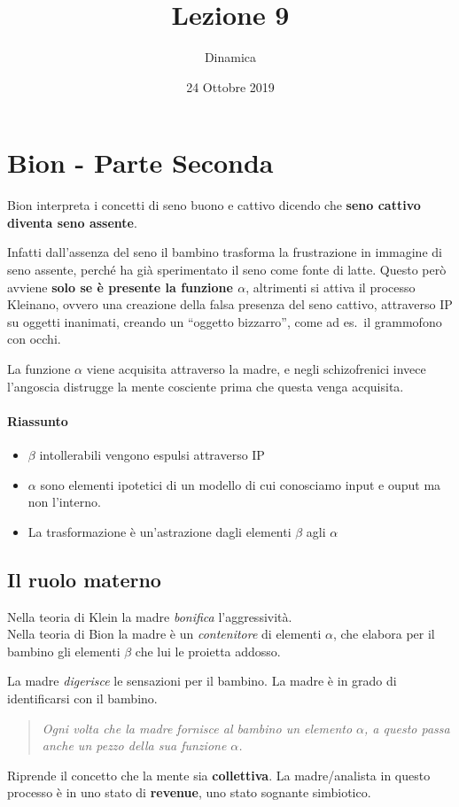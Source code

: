 \documentclass[12pt, a4paper]{article}
\date{24 Ottobre 2019}
\title{Lezione 9}
\author{Dinamica}
\begin{document}
\maketitle

\section{Bion - Parte Seconda}

Bion interpreta i concetti di seno buono e cattivo dicendo che \textbf{seno cattivo diventa seno assente}.

Infatti dall'assenza del seno il bambino trasforma la frustrazione in immagine di seno assente, perch\'e ha gi\`a sperimentato il seno come fonte di latte.
Questo però avviene \textbf{solo se \`e presente la funzione $\alpha$}, altrimenti si attiva il processo Kleinano, ovvero una creazione della falsa presenza del seno cattivo, attraverso IP su oggetti inanimati, creando un ``oggetto bizzarro'', come ad es.\ il grammofono con occhi.

La funzione $\alpha$ viene acquisita attraverso la madre, e negli schizofrenici invece l'angoscia distrugge la mente cosciente prima che questa venga acquisita.

\paragraph{Riassunto} 
\begin{itemize}
    \item $\beta$ intollerabili vengono espulsi attraverso IP
    \item $\alpha$ sono elementi ipotetici di un modello di cui conosciamo input e ouput ma non l'interno. 
    \item La trasformazione \`e un'astrazione dagli elementi $\beta$ agli $\alpha$
\end{itemize}

\subsection{Il ruolo materno}

Nella teoria di Klein la madre \emph{bonifica} l'aggressivit\`a. \\
Nella teoria di Bion la madre \`e un \emph{contenitore} di elementi $\alpha$, che elabora per il bambino gli elementi $\beta$ che lui le proietta addosso.

La madre \emph{digerisce} le sensazioni per il bambino. La madre \`e in grado di identificarsi con il bambino. \\
\medskip
\begin{quote}\emph{Ogni volta che la madre fornisce al bambino un elemento $\alpha$, a questo passa anche un pezzo della sua funzione $\alpha$.} 
\end{quote}
\medskip
Riprende il concetto che la mente sia \textbf{collettiva}. La madre/analista in questo processo \`e in uno stato di \textbf{revenue}, uno stato sognante simbiotico.
\end{document}
